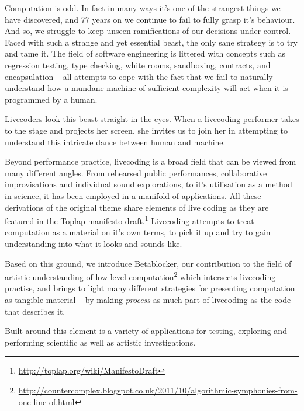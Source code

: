 \documentclass[letterpaper, 12pt]{article}
\begin{document}

Computation is odd. 
In fact in many ways it's one of the strangest things we have discovered, and 77 years on we continue to fail to fully grasp it's behaviour.
And so, we struggle to keep unseen ramifications of our decisions under control. Faced with such a strange and yet essential beast, the only sane strategy is to try and tame it. 
The field of software engineering is littered with concepts such as regression testing, type checking, white rooms, sandboxing, contracts, and encapsulation -- all attempts to cope with the fact that we fail to naturally understand how a mundane machine of sufficient complexity will act when it is programmed by a human.

Livecoders look this beast straight in the eyes. 
When a livecoding performer takes to the stage and projects her screen, she invites us to join her in attempting to understand this intricate dance between human and machine. 

Beyond performance practice, livecoding is a broad field that can be viewed from many different angles.
From rehearsed public performances, collaborative improvisations and individual sound explorations, to it's utilisation as a method in science, it has been employed in a manifold of applications.
All these derivations of the original theme share elements of live coding as they are featured in the Toplap manifesto draft.\footnote{\url{http://toplap.org/wiki/ManifestoDraft}} \citep{ward2004-liv}
Livecoding attempts to treat computation as a material on it's own terms, to pick it up and try to gain understanding into what it looks\citep{mclean2010-vis} and sounds like.

Based on this ground, we introduce Betablocker, our contribution to the field of artistic understanding of low level computation\citep{2006-the}\footnote{\url{http://countercomplex.blogspot.co.uk/2011/10/algorithmic-symphonies-from-one-line-of.html}} which intersects livecoding practise, and brings to light many different strategies for presenting computation as tangible material -- by making \emph{process} as much part of livecoding as the code that describes it.

Built around this element is a variety of applications for testing, exploring and performing scientific as well as artistic investigations.

\end{document}
